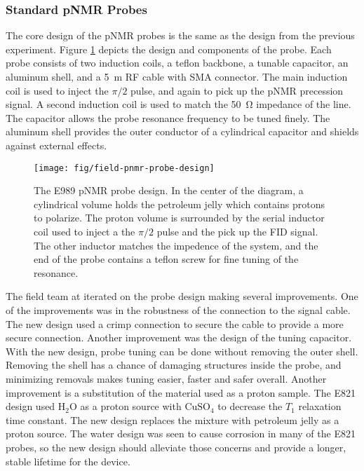 \subsubsection{Standard pNMR Probes}

The core design of the pNMR probes is the same as the design from the previous experiment. Figure \ref{fig:field-pnmr-probe-design} depicts the design and components of the probe.  Each probe consists of two induction coils, a teflon backbone, a tunable capacitor, an aluminum shell, and a \SI{5}{\meter} RF cable with SMA connector.  The main induction coil is used to inject the $\pi/2$ pulse, and again to pick up the pNMR precession signal.  A second induction coil is used to match the \SI{50}{\ohm} impedance of the line.  The capacitor allows the probe resonance frequency to be tuned finely.  The aluminum shell provides the outer conductor of a cylindrical capacitor and shields against external effects.

\begin{figure}
\centering
\texttt{[image: fig/field-pnmr-probe-design]}
\caption{
    The E989 pNMR probe design.  In the center of the diagram, a cylindrical volume holds the petroleum jelly which contains protons to polarize.  The proton volume is surrounded by the serial inductor coil used to inject a the $\pi/2$ pulse and the pick up the FID signal.  The other inductor matches the impedence of the system, and the end of the probe contains a teflon screw for fine tuning of the resonance.
    \label{fig:field-pnmr-probe-design}
}
\end{figure}

The field team at \uw iterated on the probe design making several improvements.  One of the improvements was in the robustness of the connection to the signal cable.  The new design used a crimp connection to secure the cable to provide a more secure connection.  Another improvement was the design of the tuning capacitor.  With the new design, probe tuning can be done without removing the outer shell.  Removing the shell has a chance of damaging structures inside the probe, and minimizing removals makes tuning easier, faster and safer overall.  Another improvement is a substitution of the material used as a proton sample.  The E821 design used $\mathrm{H_2O}$ as a proton source with $\mathrm{CuSO_4}$ to decrease the $T_1$ relaxation time constant.  The new design replaces the mixture with petroleum jelly as a proton source.  The water design was seen to cause corrosion in many of the E821 probes, so the new design should alleviate those concerns and provide a longer, stable lifetime for the device.

